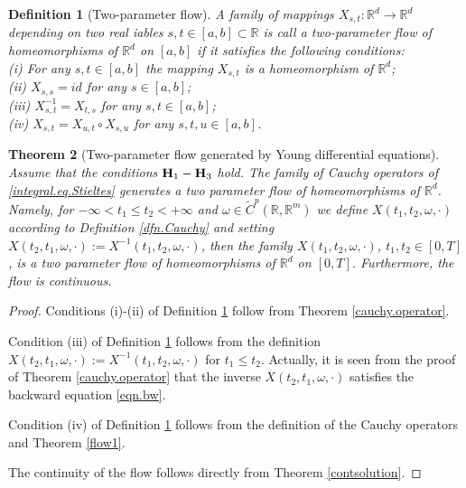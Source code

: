 \documentclass[10pt]{article}
\numberwithin{equation}{section} %
\newcommand{\R}{\ensuremath{\mathbb{R}}}
\newtheorem{theorem}{Theorem}[section]
{ \theorembodyfont{\normalfont} %
\newtheorem{example}[theorem]{Example}
\newtheorem{remark}[theorem]{Remark}
}
\newtheorem{definition}[theorem]{Definition}
\begin{document}
 \begin{definition}[Two-parameter flow]\label{dfn.2flow}
 \rm
 A family of mappings $X_{s,t} : \R^d \rightarrow \R^d$ depending on two real iables $s,t\in [a,b] \subset \R$ is call a {\em two-parameter flow of homeomorphisms of $\R^d$ on $[a,b]$} if it satisfies the following conditions:\smallskip\\
 (i) For any $s,t\in [a,b]$ the mapping $X_{s,t}$ is a homeomorphism of $\R^d$;\smallskip\\
 (ii) $X_{s,s} = id$ for any $s\in [a,b]$;\smallskip\\
 (iii) $X_{s,t}^{-1} = X_{t,s}$ for any $s,t\in [a,b]$;\smallskip\\
 (iv) $X_{s,t} = X_{u,t}\circ X_{s,u}$ for any $s,t,u\in [a,b]$.%
 \end{definition}
  
 
 \begin{theorem}[Two-parameter flow generated by Young differential equations]\label{thm.flow}
Assume that the conditions ${\textbf H}_1-{\textbf H}_3$ hold. 
 The family of Cauchy operators of \eqref{integral.eq.Stieltes} generates a two parameter flow of homeomorphisms of $\R^d$. Namely, for $-\infty< t_1\leq t_2<+\infty$ and $\omega\in \widetilde{C}^p(\R,\R^m)$  we define $X(t_1,t_2,\omega,\cdot)$ according to Definition \ref{dfn.Cauchy} and setting $X(t_2,t_1,\omega,\cdot) := X^{-1}(t_1,t_2,\omega,\cdot)$, then the family
 $X(t_1,t_2,\omega,\cdot)$, $t_1,t_2\in [0,T]$, is a two parameter flow of homeomorphisms of $\R^d$ on $[0,T]$. Furthermore, the flow is continuous. 
 \end{theorem}
 \begin{proof}
 Conditions (i)-(ii) of Definition \ref{dfn.2flow} follow from Theorem \ref{cauchy.operator}.
 
 Condition (iii) of Definition \ref{dfn.2flow} follows from the definition $X(t_2,t_1,\omega,\cdot) := X^{-1}(t_1,t_2,\omega,\cdot)$ for $t_1\leq t_2$.
 Actually, it is seen from the proof of Theorem \ref{cauchy.operator} that the inverse $X(t_2,t_1,\omega,\cdot)$ satisfies the backward equation \eqref{eqn.bw}.
 
 Condition (iv) of Definition \ref{dfn.2flow} follows from 
  the definition of the Cauchy operators and 
 Theorem  \ref{flow1}. 
 
 The continuity of the flow follows directly from Theorem \ref{contsolution}.
 \end{proof}
\end{document}
